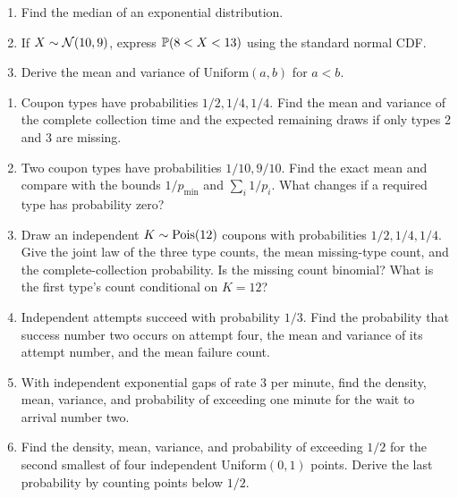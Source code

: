 \begin{exercisebox}[title={Later practice: continuous families}]
\begin{enumerate}[start=15]
 \item Find the median of an exponential distribution. 
 \item If $X\sim\Normal(10,9)$, express $\P(8<X<13)$ using the
 standard normal CDF. 
 \item Derive the mean and variance of Uniform$(a,b)$ for $a<b$.
\end{enumerate}
\end{exercisebox}




\begin{exercisebox}[title={Further practice: mechanisms and Poissonization}]
\begin{enumerate}[start=18,itemsep=1pt,parsep=0pt]
 \item Coupon types have probabilities $1/2,1/4,1/4$. Find the mean
 and variance of the complete collection time and the expected remaining
 draws if only types 2 and 3 are missing. 
 \item Two coupon types have probabilities $1/10,9/10$. Find the
 exact mean and compare with the bounds $1/p_{\min}$ and $\sum_i1/p_i$.
 What changes if a required type has probability zero? 
 \item Draw an independent $K\sim\Pois(12)$ coupons with probabilities
 $1/2,1/4,1/4$. Give the joint law of the three type counts, the mean
 missing-type count, and the complete-collection probability. Is the missing
 count binomial? What is the first type's count conditional on $K=12$?
 \item Independent attempts succeed with probability $1/3$. Find the
 probability that success number two occurs on attempt four, the mean
 and variance of its attempt number, and the mean failure count.
 \item With independent exponential gaps of rate 3 per minute, find the
 density, mean, variance, and probability of exceeding one minute for
 the wait to arrival number two. 
 \item Find the density, mean, variance, and probability of exceeding
 $1/2$ for the second smallest of four independent Uniform$(0,1)$ points.
 Derive the last probability by counting points below $1/2$.

\end{enumerate}
\end{exercisebox}
